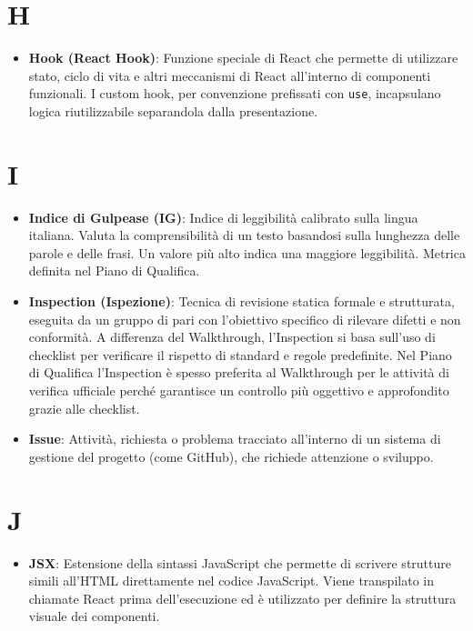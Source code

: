 \documentclass[11pt,a4paper]{article}
\begin{document}
\section*{H}
\begin{itemize}
\item \textbf{Hook (React Hook)}: Funzione speciale di React che 
permette di utilizzare stato, ciclo di vita e altri meccanismi 
di React all'interno di componenti funzionali. I custom hook, 
per convenzione prefissati con \texttt{use}, incapsulano logica 
riutilizzabile separandola dalla presentazione.
\end{itemize}
\newpage

\section*{I}
\begin{itemize}
\item \textbf{Indice di Gulpease (IG)}: Indice di leggibilità calibrato sulla lingua italiana. Valuta la comprensibilità di un testo basandosi sulla lunghezza delle parole e delle frasi. Un valore più alto indica una maggiore leggibilità. Metrica definita nel Piano di Qualifica.

\item \textbf{Inspection (Ispezione)}: Tecnica di revisione statica formale e strutturata, eseguita da un gruppo di pari con l'obiettivo specifico di rilevare difetti e non conformità. A differenza del Walkthrough, l'Inspection si basa sull'uso di checklist per verificare il rispetto di standard e regole predefinite. Nel Piano di Qualifica l'Inspection è spesso preferita al Walkthrough per le attività di verifica ufficiale perché garantisce un controllo più oggettivo e approfondito grazie alle checklist.

\item \textbf{Issue}: Attività, richiesta o problema tracciato all’interno di un sistema di gestione del progetto (come GitHub), che richiede attenzione o sviluppo.

\end{itemize}

\newpage

\section*{J}
\begin{itemize}
\item \textbf{JSX}: Estensione della sintassi JavaScript che permette 
di scrivere strutture simili all'HTML direttamente nel codice 
JavaScript. Viene transpilato in chiamate React prima dell'esecuzione 
ed è utilizzato per definire la struttura visuale dei componenti.
\end{itemize}
\end{document}
